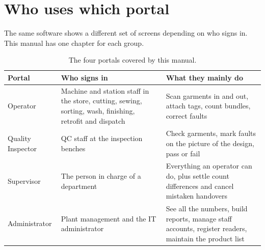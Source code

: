 \section{Who uses which portal}

The same software shows a different set of screens depending on who signs in.
This manual has one chapter for each group.

\begin{table}[H]
\centering
\small
\begin{tabular}{@{}p{34mm}p{45mm}p{60mm}@{}}
\toprule
\textbf{Portal} & \textbf{Who signs in} & \textbf{What they mainly do} \\
\midrule
Operator &
  Machine and station staff in the store, cutting, sewing, sorting, wash,
  finishing, retrofit and dispatch &
  Scan garments in and out, attach tags, count bundles, correct faults \\
Quality Inspector &
  QC staff at the inspection benches &
  Check garments, mark faults on the picture of the design, pass or fail \\
Supervisor &
  The person in charge of a department &
  Everything an operator can do, plus settle count differences and cancel
  mistaken handovers \\
Administrator &
  Plant management and the IT administrator &
  See all the numbers, build reports, manage staff accounts, register readers,
  maintain the product list \\
\bottomrule
\end{tabular}
\caption{The four portals covered by this manual.}
\end{table}
